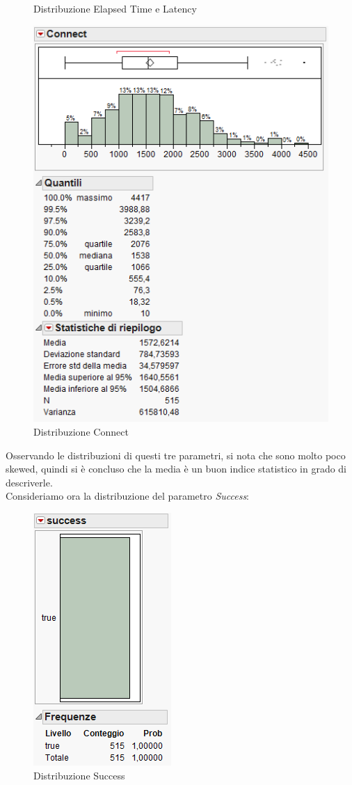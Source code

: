 \begin{figure}[H]
			\caption{Distribuzione Elapsed Time e Latency}
			\label{fig:elapse_latency}
		\end{figure}
		
		\begin{figure}[H]
			\centering
			\includegraphics[scale=0.585]{./immagine/connect.png}
			\caption{Distribuzione Connect}
			\label{fig:connect}
		\end{figure}
		
		Osservando le distribuzioni di questi tre parametri, si nota che sono molto poco skewed, quindi si è concluso che la media è un buon indice statistico in grado di descriverle.\\
		Consideriamo ora la distribuzione del parametro \textit{Success}:
		\begin{figure}[H]
			\centering
			\includegraphics[scale=0.755]{./immagine/success.png}
			\caption{Distribuzione Success}
			\label{fig:success}
		\end{figure}
		
